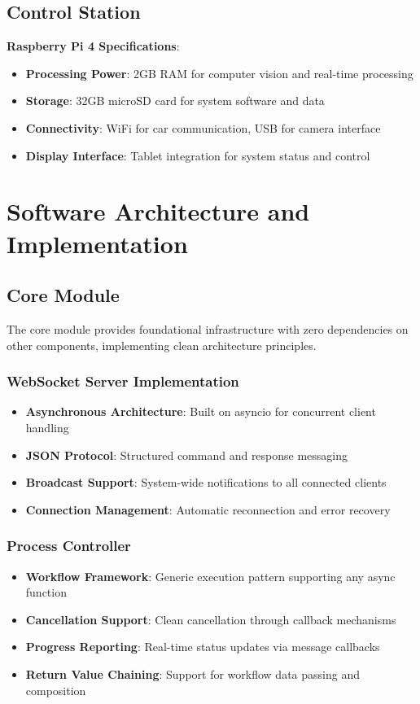 \subsection{Control Station}

\textbf{Raspberry Pi 4 Specifications}:
\begin{itemize}
    \item \textbf{Processing Power}: 2GB RAM for computer vision and real-time processing
    \item \textbf{Storage}: 32GB microSD card for system software and data
    \item \textbf{Connectivity}: WiFi for car communication, USB for camera interface
    \item \textbf{Display Interface}: Tablet integration for system status and control
\end{itemize}

\section{Software Architecture and Implementation}

\subsection{Core Module}

The core module provides foundational infrastructure with zero dependencies on other components, implementing clean architecture principles.

\subsubsection{WebSocket Server Implementation}
\begin{itemize}
    \item \textbf{Asynchronous Architecture}: Built on asyncio for concurrent client handling
    \item \textbf{JSON Protocol}: Structured command and response messaging
    \item \textbf{Broadcast Support}: System-wide notifications to all connected clients
    \item \textbf{Connection Management}: Automatic reconnection and error recovery
\end{itemize}

\subsubsection{Process Controller}
\begin{itemize}
    \item \textbf{Workflow Framework}: Generic execution pattern supporting any async function
    \item \textbf{Cancellation Support}: Clean cancellation through callback mechanisms
    \item \textbf{Progress Reporting}: Real-time status updates via message callbacks
    \item \textbf{Return Value Chaining}: Support for workflow data passing and composition
\end{itemize}

